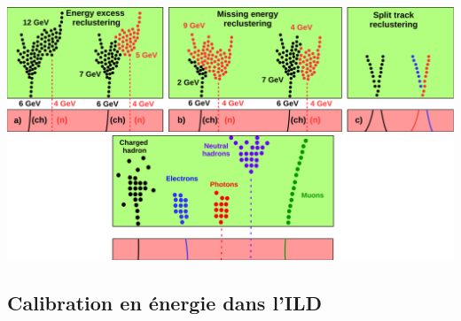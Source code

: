 \documentclass[8pt]{beamer}
\begin{document}
\begin{frame}
\begin{overprint}
       \centering \includegraphics[width=0.8\linewidth]{ReclusteringAlgorithmsILD.pdf}
       \centering \includegraphics[width=0.8\linewidth]{ILDPfoCreationParticleID.pdf}
    \end{overprint}
  \end{frame}

  \subsection{Calibration en énergie dans l'ILD}
\end{document}
